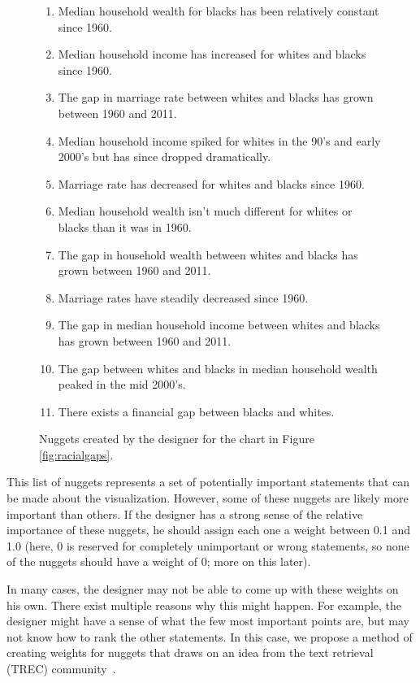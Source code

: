 \documentclass{sigchi}
\begin{document}
\begin{figure}[t]
  \begin{framed}
  \begin{center}
    \begin{enumerate}
    \item Median household wealth for blacks has been relatively constant since 1960.
    \item Median household income has increased for whites and blacks since 1960.
    \item The gap in marriage rate between whites and blacks has grown between 1960 and 2011.
    \item Median household income spiked for whites in the 90's and early 2000's but has since dropped dramatically.
    \item Marriage rate has decreased for whites and blacks since 1960.
    \item Median household wealth isn't much different for whites or blacks than it was in 1960.
    \item The gap in household wealth between whites and blacks has grown between 1960 and 2011.
    \item Marriage rates have steadily decreased since 1960.
    \item The gap in median household income between whites and blacks has grown between 1960 and 2011.
    \item The gap between whites and blacks in median household wealth peaked in the mid 2000's.
    \item There exists a financial gap between blacks and whites.
    \end{enumerate}
  \end{center}
  \end{framed}
  \caption{Nuggets created by the designer for the chart in Figure \ref{fig:racialgaps}.}
  \label{fig:nuggets}
\end{figure}

This list of nuggets represents a set of potentially important
statements that can be made about the visualization. However, some of
these nuggets are likely more important than others. If the designer
has a strong sense of the relative importance of these nuggets, he
should assign each one a weight between 0.1 and 1.0 (here, 0 is
reserved for completely unimportant or wrong statements, so none of
the nuggets should have a weight of 0; more on this later).

In many cases, the designer may not be able to come up with these
weights on his own. There exist multiple reasons why this might
happen. For example, the designer might have a sense of what the few
most important points are, but may not know how to rank the other
statements. In this case, we propose a method of creating weights for
nuggets that draws on an idea from the text retrieval (TREC)
community~\cite{lin2006will}.
\end{document}
